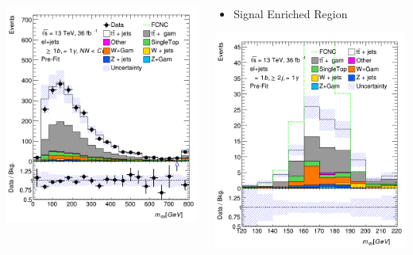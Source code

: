 \documentclass[10pt]{beamer}
\begin{document}
{\begin{columns}
\begin{column}{0.35\textwidth}
\begin{itemize}
\end{itemize}
\includegraphics[width=.95\textwidth]{Images/SystwoSyst/Plots/VR2_mqph.png} \\
\end{column}
\begin{column}{0.33\textwidth}
\begin{itemize}
\item Signal Enriched Region
\end{itemize}
\includegraphics[width=.95\textwidth]{Images/SystwoSyst/Plots/SR_mqph.png}

\end{column}
\end{columns}}
\end{document}
